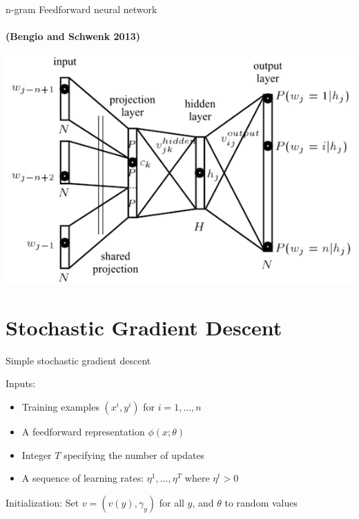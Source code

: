 \begin{frame}{n-gram Feedforward neural network}
\framesubtitle{(Bengio and Schwenk 2013)}
\begin{block}{}
\centering
\includegraphics[scale=0.4]{figures/ngramfflm.png}
\end{block}
\end{frame}

\section{Stochastic Gradient Descent}
\frame{\tableofcontents[currentsection]}

\begin{frame}{Simple stochastic gradient descent}
\begin{block}{Inputs:}
\begin{itemize}[<+->]
\item Training examples $(x^i, y^i)$ for $i = 1, \ldots, n$
\item A feedforward representation $\phi(x; \theta)$
\item Integer $T$ specifying the number of updates
\item A sequence of learning rates: $\eta^1, \ldots, \eta^T$ where $\eta^t > 0$
\end{itemize}
\end{block}
\pause
\begin{block}{Initialization:}
Set $v = (v(y), \gamma_y)$ for all $y$, and $\theta$ to random values
\end{block}
\end{frame}

